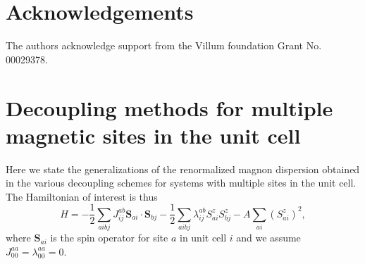 \documentclass[aps,prb,reprint,floatfix,superscriptaddress]{revtex4-2}
\begin{document}
\section{Acknowledgements}
The authors acknowledge support from the Villum foundation Grant No. 00029378.

\appendix
\section{Decoupling methods for multiple magnetic sites in the unit cell}\label{sec:multisite}
Here we state the generalizations of the renormalized magnon dispersion obtained in the various decoupling schemes for systems with multiple sites in the unit cell. The Hamiltonian of interest is thus
\begin{equation}
    H = -\frac{1}{2}\sum_{aibj} J_{ij}^{ab}\mathbf{S}_{ai} \cdot \mathbf{S}_{bj} -\frac{1}{2}\sum_{aibj} \lambda_{ij}^{ab}S_{ai}^z  S_{bj}^z  - A \sum_{ai}(S_{ai}^z)^2,
\end{equation}
where $\mathbf{S}_{ai}$ is the spin operator for site $a$ in unit cell $i$ and we assume $J_{00}^{aa}=\lambda_{00}^{aa}=0$.
\end{document}
